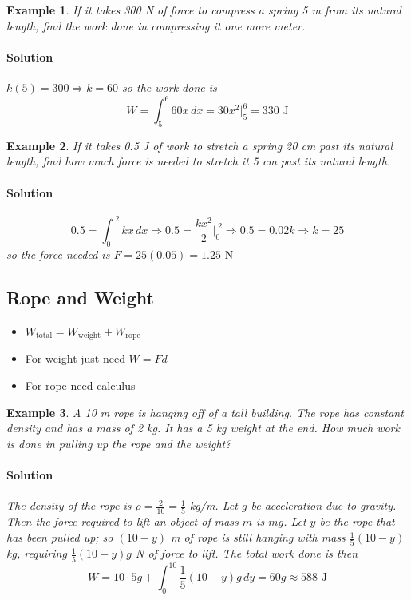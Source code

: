 \documentclass[letterpaper, 11pt, openany]{book}
\theoremstyle{mytheoremstyle}
\theoremstyle{myexamplestyle}
\newtheorem{example}{Example}[section]
\newenvironment{solution}{\paragraph{\sffamily \smaller \fontseries{b}\selectfont Solution}}{\hfill\faSquare}
\begin{document}
\begin{example}
    \label{e:workgivenforce}If it takes 300 N of force to compress a spring 5 m from its natural length, find the work done in compressing it one more meter.    
    
    \begin{solution}
        $k(5) = 300 \Rightarrow k = 60$ so the work done is
        \[W = \int_{5}^{6} 60x \, dx = 30x^{2}\Big|_{5}^{6} = 330 \text{ J}\]
    \end{solution}
\end{example}

\begin{example}
    \label{e:workgivenwork}If it takes 0.5 J of work to stretch a spring 20 cm past its natural length, find how much force is needed to stretch it 5 cm past its natural length.
        
    \begin{solution}
        \[0.5 = \int_{0}^{.2} kx \, dx \Rightarrow 0.5 = \frac{kx^{2}}{2}\Big|_{0}^{.2} \Rightarrow 0.5 =  0.02k \Rightarrow k = 25 \]
        so the force needed is $F = 25(0.05) = 1.25 \text{ N}$
    \end{solution}
\end{example}

\subsection{Rope and Weight}
\begin{itemize}
    \item $W_{\text{total}} = W_{\text{weight}} + W_{\text{rope}}$
    \item For weight just need $W = Fd$ \faSmile
    \item For rope need calculus \faMeh
\end{itemize}

\begin{example}
    \label{e:workropeandweight} A 10 m rope is hanging off of a tall building. The rope has constant density and has a mass of 2 kg. It has a 5 kg weight at the end. How much work is done in pulling up the rope and the weight?    
    
    \begin{solution}
        The density of the rope is $\rho = \frac{2}{10} = \frac{1}{5}$ kg/m. Let $g$ be acceleration due to gravity. Then the force required to lift an object of mass $m$ is $mg$. Let $y$ be the rope that has been pulled up; so $(10 - y)$ m of rope is still hanging with mass $\frac{1}{5}(10-y)$ kg, requiring $\frac{1}{5}(10-y)g$ N of force to lift. The total work done is then
        \[W = 10\cdot 5g + \int_{0}^{10} \frac{1}{5}(10-y)g \, dy = 60g \approx 588\text{ J}\] 
    \end{solution}  
\end{example}
\end{document}
